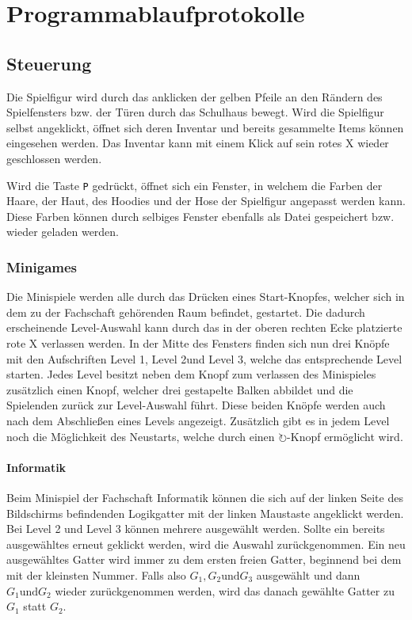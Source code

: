\chapter{Programmablaufprotokolle}

\section{Steuerung}

Die Spielfigur wird durch das anklicken der gelben Pfeile an den Rändern des Spielfensters bzw. der Türen durch das Schulhaus bewegt. Wird die Spielfigur selbst angeklickt, öffnet sich deren Inventar
und bereits gesammelte Items können eingesehen werden. Das Inventar kann mit einem Klick auf sein rotes \glqq{}X\grqq{} wieder geschlossen werden.

Wird die Taste \texttt{P} gedrückt, öffnet sich ein Fenster, in welchem die Farben der Haare, der
Haut, des Hoodies und der Hose der Spielfigur angepasst werden kann. Diese Farben können durch
selbiges Fenster ebenfalls als Datei gespeichert bzw. wieder geladen werden.

\subsection{Minigames}

Die Minispiele werden alle durch das Drücken eines Start-Knopfes, welcher sich in dem zu der Fachschaft gehörenden Raum befindet, gestartet.
Die dadurch erscheinende Level-Auswahl kann durch das in der oberen rechten Ecke platzierte rote \glqq{}X\grqq{} verlassen werden.
In der Mitte des Fensters finden sich nun drei Knöpfe mit den Aufschriften \glqq Level 1\grqq, \glqq Level 2\grqq und \glqq Level 3\grqq, welche das entsprechende Level starten.
Jedes Level besitzt neben dem Knopf zum verlassen des Minispieles zusätzlich einen Knopf, welcher drei gestapelte Balken abbildet und die Spielenden zurück zur Level-Auswahl führt.
Diese beiden Knöpfe werden auch nach dem Abschließen eines Levels angezeigt.
Zusätzlich gibt es in jedem Level noch die Möglichkeit des Neustarts, welche durch einen \glqq $\circlearrowright$\grqq{}-Knopf ermöglicht wird.

\subsubsection{Informatik}

Beim Minispiel der Fachschaft Informatik können die sich auf der linken Seite des Bildschirms befindenden Logikgatter mit der linken Maustaste angeklickt werden.
Bei Level 2 und Level 3 können mehrere ausgewählt werden.
Sollte ein bereits ausgewähltes erneut geklickt werden, wird die Auswahl zurückgenommen.
Ein neu ausgewähltes Gatter wird immer zu dem ersten freien Gatter, beginnend bei dem mit der kleinsten Nummer.
Falls also $G_1, G_2 \text{und} G_3$ ausgewählt und dann $G_1 \text{und} G_2$ wieder zurückgenommen werden, wird das danach gewählte Gatter zu $G_1$ statt $G_2$.

